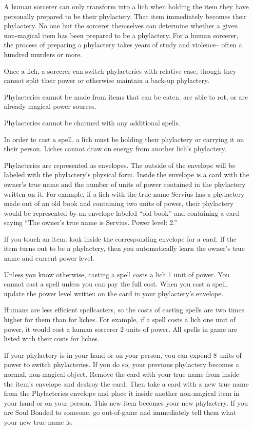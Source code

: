 \documentclass[green]{Sel}
\begin{document}
\name{\gPhylactery{}}
A human sorcerer can only transform into a lich when holding the item they have personally prepared to be their phylactery. That item immediately becomes their phylactery. No one but the sorcerer themselves can determine whether a given non-magical item has been prepared to be a phylactery. For a human sorcerer, the process of preparing a phylactery takes years of study and violence-- often a hundred murders or more. 

Once a lich, a sorcerer can switch phylacteries with relative ease, though they cannot split their power or otherwise maintain a back-up phylactery.

Phylacteries cannot be made from items that can be eaten, are able to rot, or are already magical power sources.

Phylacteries cannot be charmed with any additional spells.

In order to cast a spell, a lich must be holding their phylactery or carrying it on their person. Liches cannot draw on energy from another lich’s phylactery.

Phylacteries are represented as envelopes. The outside of the envelope will be labeled with the phylactery’s physical form. Inside the envelope is a card with the owner’s true name and the number of units of power contained in the phylactery written on it. For example, if a lich with the true name Servius has a phylactery made out of an old book and containing two units of power, their phylactery would be represented by an envelope labeled “old book” and containing a card saying “The owner’s true name is Servius. Power level: 2.”

If you touch an item, look inside the corresponding envelope for a card. If the item turns out to be a phylactery, then you automatically learn the owner’s true name and current power level.

Unless you know otherwise, casting a spell costs a lich 1 unit of power. You cannot cast a spell unless you can pay the full cost. When you cast a spell, update the power level written on the card in your phylactery’s envelope.

Humans are less efficient spellcasters, so the costs of casting spells are two times higher for them than for liches. For example, if a spell costs a lich one unit of power, it would cost a human sorcerer 2 units of power. All spells in game are listed with their costs for liches.

If your phylactery is in your hand or on your person, you can expend 8 units of power to switch phylacteries. If you do so, your previous phylactery becomes a normal, non-magical object. Remove the card with your true name from inside the item’s envelope and destroy the card. Then take a card with a new true name from the Phylacteries envelope and place it inside another non-magical item in your hand or on your person. This new item becomes your new phylactery. If you are Soul Bonded to someone, go out-of-game and immediately tell them what your new true name is.
\end{document}
